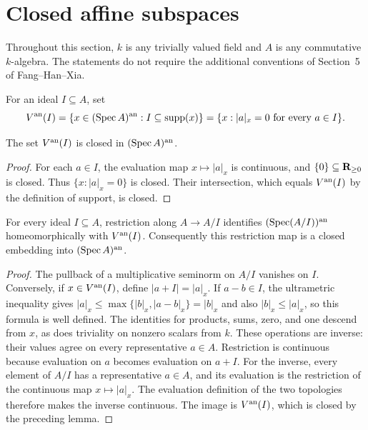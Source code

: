 \section{Closed affine subspaces}\label{sec:closed-affine-subspaces}

Throughout this section, $k$ is any trivially valued field and $A$ is any commutative
$k$-algebra. The statements do not require the additional conventions of Section~5
of Fang--Han--Xia.

\begin{definition}\label{def:analytic-zero-locus}
\leanok
{}
For an ideal $I\subseteq A$, set
\[
 V^{\mathrm{an}}(I)=\{x\in(\operatorname{Spec} A)^{\mathrm{an}}: I\subseteq\operatorname{supp}(x)\}
 =\{x: |a|_x=0\text{ for every }a\in I\}.
\]
\end{definition}

\begin{lemma}\label{lem:analytic-zero-locus-closed}
\leanok
{}
The set $V^{\mathrm{an}}(I)$ is closed in $(\operatorname{Spec} A)^{\mathrm{an}}$.
\end{lemma}

\begin{proof}
For each $a\in I$, the evaluation map $x\mapsto |a|_x$ is continuous, and
$\{0\}\subseteq\mathbf{R}_{\ge0}$ is closed. Thus $\{x:|a|_x=0\}$ is closed.
Their intersection, which equals $V^{\mathrm{an}}(I)$ by the definition of support, is closed.
\end{proof}

\begin{lemma}\label{lem:analytic-affine-quotient}
\leanok
{}
For every ideal $I\subseteq A$, restriction along $A\to A/I$ identifies
$(\operatorname{Spec}(A/I))^{\mathrm{an}}$ homeomorphically with $V^{\mathrm{an}}(I)$.
Consequently this restriction map is a closed embedding into $(\operatorname{Spec} A)^{\mathrm{an}}$.
\end{lemma}

\begin{proof}
The pullback of a multiplicative seminorm on $A/I$ vanishes on $I$.
Conversely, if $x\in V^{\mathrm{an}}(I)$, define $|a+I|=|a|_x$.
If $a-b\in I$, the ultrametric inequality gives
$|a|_x\le\max\{|b|_x,|a-b|_x\}=|b|_x$ and also $|b|_x\le|a|_x$,
so this formula is well defined. The identities for products, sums, zero, and one
descend from $x$, as does triviality on nonzero scalars from $k$.
These operations are inverse: their values agree on every representative $a\in A$.
Restriction is continuous because evaluation on $a$ becomes evaluation on $a+I$.
For the inverse, every element of $A/I$ has a representative $a\in A$,
and its evaluation is the restriction of the continuous map $x\mapsto |a|_x$.
The evaluation definition of the two topologies therefore makes the inverse continuous.
The image is $V^{\mathrm{an}}(I)$, which is closed by the preceding lemma.
\end{proof}

